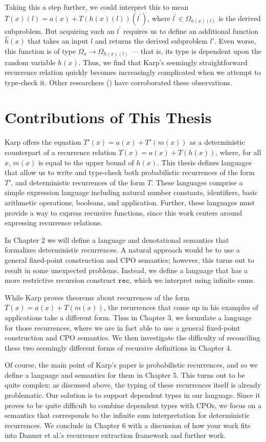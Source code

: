 Taking this a step further, we could interpret this to mean $T(x)(l) = a(x) + T(h(x)(l))(l^\prime)$, where $l^\prime \in 
\Omega_{h(x)(l)}$ is the derived subproblem. But acquiring such an $l^\prime$ requires us to define an 
additional function $\hat{h}(x)$ that takes an input $l$ and returns the derived subproblem $l'$. 
Even worse, this function is of type $\Omega_x \rightarrow \Omega_{h(x)(l)}$ --- that is, its type is dependent 
upon the random variable $h(x)$. Thus, we find that Karp's seemingly straightforward recurrence relation quickly becomes 
increasingly complicated when we attempt to type-check it. Other researchers (\cite{Tassarotti:2017aa}) have corroborated 
these observations. 


\section{Contributions of This Thesis}

Karp offers the equation $T'(x) = a(x) + T'(m(x))$ as a deterministic counterpart of a recurrence relation $T(x) = a(x) + 
T(h(x))$, where, for all $x$, $m(x)$ is equal to the upper bound of $h(x)$. This thesis defines languages that allow
us to write and type-check both probabilistic recurrences of the form $T'$, and deterministic recurrences
of the form $T$. These languages comprise a simple expression language including natural number constants, identifiers, basic arithmetic operations, booleans, and application. Further, these languages must provide
a way to express recursive functions, since this work centers around expressing recurrence relations. 
 
In Chapter 2 we will define a language and denotational semantics that formalizes deterministic recurrences.  A natural 
approach would be to use a general fixed-point construction and CPO semantics; however, this turns out to result in some 
unexpected problems. Instead, we define a language that has a more restrictive recursion construct $\texttt{rec}$, which 
we interpret using infinite sums.  

While Karp proves theorems about recurrences of the form $T(x) = a(x) + T(m(x))$, the recurrences that come up in his 
examples of applications take a different form. Thus in Chapter 3, we formulate a language for those recurrences, where 
we are in fact able to use a general fixed-point construction and CPO semantics.  We then investigate the difficulty of 
reconciling these two seemingly different forms of recursive definitions in Chapter 4. 

 Of course, the main point of Karp's paper is probabilistic recurrences, and so we define a language and semantics for 
 them in Chapter 5.  This turns out to be quite complex: as discussed above, the typing of these recurrences itself is 
 already problematic. Our solution is to support dependent types in our language. Since it proves to be quite difficult to 
 combine dependent types with CPOs, we focus on a semantics that corresponds to the infinite sum interpretation for
 deterministic recurrences. We conclude in Chapter 6 with a discussion of how your work fits into Danner et al.'s 
 recurrence extraction framework and further work.
 

